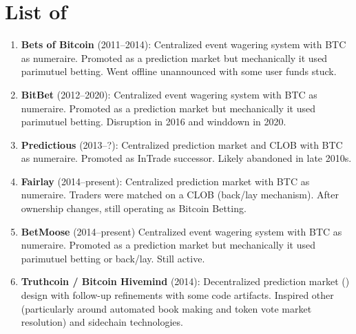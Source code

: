 
\section{List of \depms}


\begin{enumerate}

\item \textbf{Bets of Bitcoin} (2011--2014): Centralized event wagering system with BTC as numeraire. Promoted as a prediction market but mechanically it used parimutuel betting. Went offline unannounced with some user funds stuck.

\item \textbf{BitBet} (2012--2020): Centralized event wagering system with BTC as numeraire. Promoted as a prediction market but mechanically it used parimutuel betting. Disruption in 2016 and winddown in 2020. 

\item \textbf{Predictious} (2013--?): Centralized prediction market and CLOB with BTC as numeraire. Promoted as InTrade successor. Likely abandoned in late 2010s.

\item \textbf{Fairlay} (2014--present): Centralized prediction market with BTC as numeraire. Traders were matched on a CLOB (back/lay mechanism). After ownership changes, still operating as Bitcoin Betting. 

\item \textbf{BetMoose} (2014--present) Centralized event wagering system with BTC as numeraire. Promoted as a prediction market but mechanically it used parimutuel betting or back/lay. Still active. 

\item \textbf{Truthcoin / Bitcoin Hivemind} (2014): Decentralized prediction market (\depm) design with follow-up refinements with some code artifacts. Inspired other \depms (particularly around automated book making and token vote market resolution) and sidechain technologies.


\end{enumerate}
